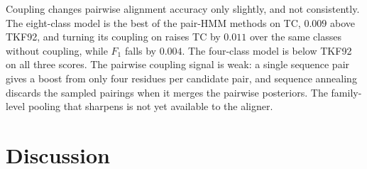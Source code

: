 \documentclass[11pt]{article}
\begin{document}
Coupling changes pairwise alignment accuracy only slightly, and not
consistently. The eight-class model is the best of the pair-HMM methods on
TC, $0.009$ above TKF92, and turning its coupling on raises TC by $0.011$ over
the same classes without coupling, while $F_1$ falls by $0.004$. The four-class
model is below TKF92 on all three scores. The pairwise coupling signal is
weak: a single sequence pair gives a boost from only four residues per
candidate pair, and sequence annealing discards the sampled pairings when it
merges the pairwise posteriors. The family-level pooling that sharpens
 is not yet available to the aligner.

\section{Discussion}
\label{sec:discussion}
\end{document}
